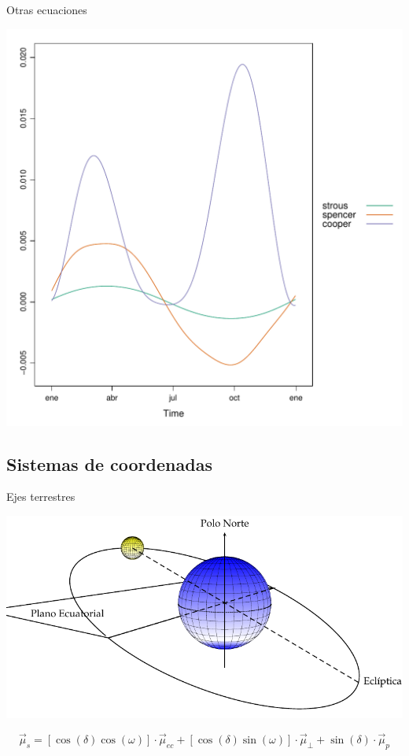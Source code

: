 \documentclass[xcolor={usenames,svgnames,dvipsnames}]{beamer}
\begin{document}
\begin{frame}[label={sec:orgbbf061e}]{Otras ecuaciones}
\begin{center}
\includegraphics[width=.9\linewidth]{../figs/DeclinacionDiferencias.pdf}
\end{center}
\end{frame}

\subsection{Sistemas de coordenadas}
\label{sec:org3ec6f39}

\begin{frame}[label={sec:orga4d1574}]{Ejes terrestres}
\begin{center}
\includegraphics[width=.9\linewidth]{../figs/SoldesdeTierra.pdf}
\end{center}

\[\vec{\mu}_{s}=\left[\cos\left(\delta\right)\cos\left(\omega\right)\right]\cdot\vec{\mu}_{ec}+\left[\cos\left(\delta\right)\sin\left(\omega\right)\right]\cdot\vec{\mu}_{\bot}+\sin\left(\delta\right)\cdot\vec{\mu}_{p}\]
\end{frame}
\end{document}
